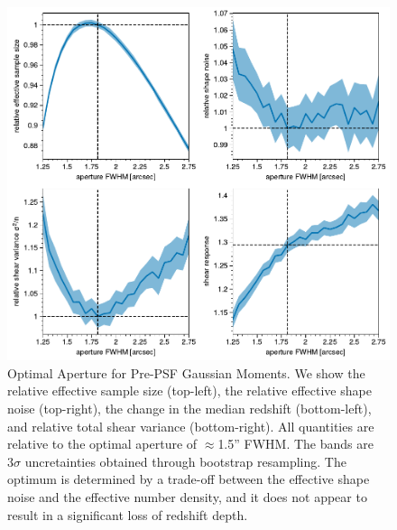 \documentclass[twocolappendix, appendixfloats, numberedappendix, twocolumn, apj]{openjournal}
\begin{document}
\begin{figure}
  \centering
  \vspace{1em}
  \includegraphics[width=\columnwidth]{figures/optap.pdf}
  \caption{
    Optimal Aperture for Pre-PSF Gaussian Moments. We show the relative effective sample
    size (top-left), the relative effective shape noise (top-right), the change in the median
    redshift (bottom-left), and relative total shear variance (bottom-right). All quantities are
    relative to the optimal aperture of $\approx$1.5'' FWHM. The bands are $3\sigma$ uncretainties
    obtained through bootstrap resampling. The optimum is determined by a trade-off
    between the effective shape noise and the effective number density, and it does not appear to
    result in a significant loss of redshift depth.
    \label{fig:opap}
  }
\end{figure}
\end{document}
